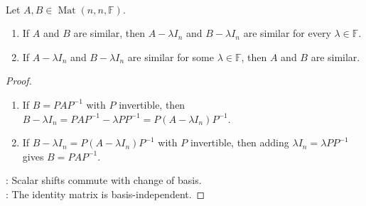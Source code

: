 \begin{theorem} \label{thm:similarity-preserves-scalar-shifts} \\
Let $A,B\in\operatorname{Mat}(n,n,\mathbb{F})$.
\begin{enumerate}[label=(\roman*)]
\setlength{\itemsep}{0pt}
\item If $A$ and $B$ are similar, then $A-\lambda I_n$ and $B-\lambda I_n$ are similar for every $\lambda\in\mathbb{F}$.
\item If $A-\lambda I_n$ and $B-\lambda I_n$ are similar for some $\lambda\in\mathbb{F}$, then $A$ and $B$ are similar.
\end{enumerate}
\begin{proof}
\begin{enumerate}[label=(\roman*)]
\setlength{\itemsep}{0pt}
\item If $B=PAP^{-1}$ with $P$ invertible, then $B-\lambda I_n=PAP^{-1}-\lambda PP^{-1}=P(A-\lambda I_n)P^{-1}$.
\item If $B-\lambda I_n=P(A-\lambda I_n)P^{-1}$ with $P$ invertible, then adding $\lambda I_n=\lambda PP^{-1}$ gives $B=PAP^{-1}$.
\end{enumerate}
: Scalar shifts commute with change of basis.\\
: The identity matrix is basis-independent.
\end{proof}
\end{theorem}
